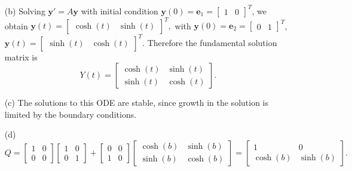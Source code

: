 \documentclass[a4paper]{book}
\makeatletter
\newenvironment{sol}[1][\solname]{\par
  \pushQED{\qed}
  \normalfont \topsep6\p@\@plus6\p@\relax
  \trivlist
  \item[\hskip\labelsep
        \itshape
    #1\@addpunct{.}]\ignorespaces
}{\popQED\endtrivlist\@endpefalse}
\providecommand{\solname}{Solution}
\numberwithin{equation}{chapter}
\theoremstyle{definition}
\makeatother
\begin{document}
\begin{sol}
\begin{itemize}
  \item[(b)]
    Solving $\mathbf{y}'=A\mathbf{y}$ with
    initial condition $\mathbf{y}(0)=\mathbf{e}_1 =
    \begin{bmatrix}
      1 & 0
    \end{bmatrix}^T
    $, we obtain
    $\mathbf{y}(t)=
    \begin{bmatrix}
      \cosh(t) & \sinh(t)
    \end{bmatrix}^T,
    $
    with $\mathbf{y}(0)=\mathbf{e}_2=
    \begin{bmatrix}
      0 & 1
    \end{bmatrix}^T
  $,  $\mathbf{y}(t) =
  \begin{bmatrix}
    \sinh(t) &
    \cosh(t)
  \end{bmatrix}^T
  $.
  Therefore the fundamental solution matrix is
      \begin{displaymath}
        Y(t) =
        \begin{bmatrix}
          \cosh(t) & \sinh(t) \\
          \sinh(t) & \cosh(t)
        \end{bmatrix}.
      \end{displaymath}
  
    \item[(c)]
      The solutions to this ODE are stable,
      since growth in the solution
      is limited by the boundary conditions.
  
    \item[(d)]
      \begin{displaymath}
        Q =
        \begin{bmatrix}
          1 & 0 \\
          0 & 0
        \end{bmatrix}
        \begin{bmatrix}
          1 & 0 \\
          0 & 1
        \end{bmatrix}
        +
        \begin{bmatrix}
          0 & 0 \\
          1 & 0
        \end{bmatrix}
        \begin{bmatrix}
          \cosh(b) & \sinh(b) \\
          \sinh(b) & \cosh(b)
        \end{bmatrix} =
        \begin{bmatrix}
          1 & 0 \\
          \cosh(b) & \sinh(b)
        \end{bmatrix}.
      \end{displaymath}
  

\end{itemize}
\end{sol}
\end{document}
